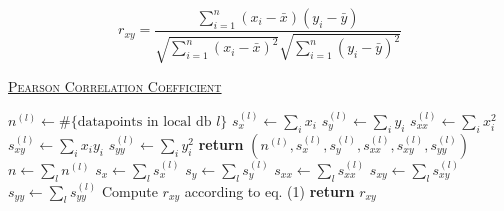 \documentclass[10pt]{article}
\newcommand{\be}[1]{\begin{equation} \label{eq:#1}}
\newcommand{\ee}{\end{equation}}
\begin{document}
\be{pearsonr}
r_{xy} =\frac{\sum ^n _{i=1}(x_i - \bar{x})(y_i - \bar{y})}{\sqrt{\sum ^n _{i=1}(x_i - \bar{x})^2} \sqrt{\sum ^n _{i=1}(y_i - \bar{y})^2}}
\ee


\begin{algorithm}

        \caption{\underline{\textsc{Pearson Correlation Coefficient}}}
        \label{pearson}
        \begin{algorithmic}[1] %
                 
                        \State $n^{(l)} \gets \# \{\text{datapoints in local db } l\}$
                        \State $s_x^{(l)} \gets \sum_i x_i$
                        \State $s_y^{(l)} \gets \sum_i y_i$
                        \State $s_{xx}^{(l)} \gets \sum_i x_i^2$
                        \State $s_{xy}^{(l)} \gets \sum_i x_i y_i$
                        \State $s_{yy}^{(l)} \gets \sum_i y_i^2$
                        \State \textbf{return} $(n^{(l)}, s_x^{(l)}, s_y^{(l)}, s_{xx}^{(l)}, s_{xy}^{(l)}, s_{yy}^{(l)} )$ \EndProcedure
                        \State $n \gets \sum_l n^{(l)}$
                        \State $s_x \gets \sum_l s_x^{(l)}$
                        \State $s_y \gets \sum_l s_y^{(l)}$
                        \State $s_{xx} \gets \sum_l s_{xx}^{(l)}$
                        \State $s_{xy} \gets \sum_l s_{xy}^{(l)}$
                        \State $s_{yy} \gets \sum_l s_{yy}^{(l)}$
                        \State Compute $r_{xy}$ according to eq. (1)
                        \State \textbf{return} $r_{xy}$
                        \EndProcedure
        \end{algorithmic}

\end{algorithm}
\end{document}
